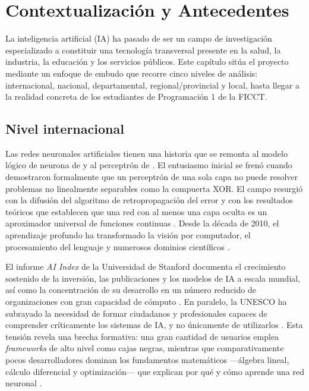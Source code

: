 \chapter{Contextualización y Antecedentes}\label{cap:contexto}
La inteligencia artificial (IA) ha pasado de ser un campo de investigación especializado a constituir una tecnología transversal presente en la salud, la industria, la educación y los servicios públicos. Este capítulo sitúa el proyecto mediante un enfoque de embudo que recorre cinco niveles de análisis: internacional, nacional, departamental, regional/provincial y local, hasta llegar a la realidad concreta de los estudiantes de Programación 1 de la FICCT.

\section{Nivel internacional}
Las redes neuronales artificiales tienen una historia que se remonta al modelo lógico de neurona de \citet{mcculloch1943} y al perceptrón de \citet{rosenblatt1958}. El entusiasmo inicial se frenó cuando \citet{minsky1969} demostraron formalmente que un perceptrón de una sola capa no puede resolver problemas no linealmente separables como la compuerta XOR. El campo resurgió con la difusión del algoritmo de retropropagación del error \citep{rumelhart1986} y con los resultados teóricos que establecen que una red con al menos una capa oculta es un aproximador universal de funciones continuas \citep{cybenko1989,hornik1989}. Desde la década de 2010, el aprendizaje profundo ha transformado la visión por computador, el procesamiento del lenguaje y numerosos dominios científicos \citep{lecun2015,goodfellow2016}.

El informe \emph{AI Index} de la Universidad de Stanford documenta el crecimiento sostenido de la inversión, las publicaciones y los modelos de IA a escala mundial, así como la concentración de su desarrollo en un número reducido de organizaciones con gran capacidad de cómputo \citep{maslej2024}. En paralelo, la UNESCO ha subrayado la necesidad de formar ciudadanos y profesionales capaces de comprender críticamente los sistemas de IA, y no únicamente de utilizarlos \citep{unesco2022}. Esta tensión revela una brecha formativa: una gran cantidad de usuarios emplea \emph{frameworks} de alto nivel como cajas negras, mientras que comparativamente pocos desarrolladores dominan los fundamentos matemáticos ---álgebra lineal, cálculo diferencial y optimización--- que explican por qué y cómo aprende una red neuronal \citep{deisenroth2020}.

